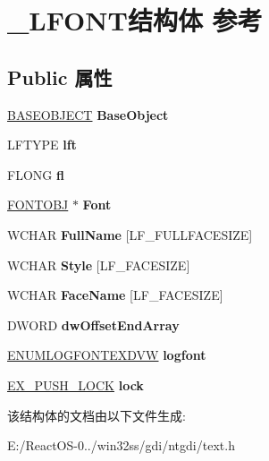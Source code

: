\hypertarget{struct___l_f_o_n_t}{}\section{\+\_\+\+L\+F\+O\+N\+T结构体 参考}
\label{struct___l_f_o_n_t}
\subsection*{Public 属性}
\begin{DoxyCompactItemize}
\item 
\mbox{\label{struct___l_f_o_n_t_a4c292ba24cdbed94a70dd511fed83c4c}} 
\hyperlink{class_b_a_s_e_o_b_j_e_c_t}{B\+A\+S\+E\+O\+B\+J\+E\+CT} {\bfseries Base\+Object}
\item 
\mbox{\label{struct___l_f_o_n_t_a055759a13076f2bf77b63b7d48b99d9d}} 
L\+F\+T\+Y\+PE {\bfseries lft}
\item 
\mbox{\label{struct___l_f_o_n_t_a53afd6843ad26a4816401cbc1c2c8577}} 
F\+L\+O\+NG {\bfseries fl}
\item 
\mbox{\label{struct___l_f_o_n_t_a83db85717136515309c697c16a28aa92}} 
\hyperlink{struct___f_o_n_t_o_b_j}{F\+O\+N\+T\+O\+BJ} $\ast$ {\bfseries Font}
\item 
\mbox{\label{struct___l_f_o_n_t_a316d3fb709a0be38fa950e9d0d05c4e6}} 
W\+C\+H\+AR {\bfseries Full\+Name} \mbox{[}L\+F\+\_\+\+F\+U\+L\+L\+F\+A\+C\+E\+S\+I\+ZE\mbox{]}
\item 
\mbox{\label{struct___l_f_o_n_t_a1ae1439dd278dab1392b977795464342}} 
W\+C\+H\+AR {\bfseries Style} \mbox{[}L\+F\+\_\+\+F\+A\+C\+E\+S\+I\+ZE\mbox{]}
\item 
\mbox{\label{struct___l_f_o_n_t_acc67b04a6b9872917ed00172302952df}} 
W\+C\+H\+AR {\bfseries Face\+Name} \mbox{[}L\+F\+\_\+\+F\+A\+C\+E\+S\+I\+ZE\mbox{]}
\item 
\mbox{\label{struct___l_f_o_n_t_a359cc067c3b280d39e4747ff05f04621}} 
D\+W\+O\+RD {\bfseries dw\+Offset\+End\+Array}
\item 
\mbox{\label{struct___l_f_o_n_t_a72a0c8141b1fadf8cf6e35b2fe6f3a7a}} 
\hyperlink{structtag_e_n_u_m_l_o_g_f_o_n_t_e_x_d_v_w}{E\+N\+U\+M\+L\+O\+G\+F\+O\+N\+T\+E\+X\+D\+VW} {\bfseries logfont}
\item 
\mbox{\label{struct___l_f_o_n_t_aa1140e3cc97c26af0b70dff7700d6d23}} 
\hyperlink{struct___e_x___p_u_s_h___l_o_c_k}{E\+X\+\_\+\+P\+U\+S\+H\+\_\+\+L\+O\+CK} {\bfseries lock}
\end{DoxyCompactItemize}


该结构体的文档由以下文件生成\+:\begin{DoxyCompactItemize}
\item 
E\+:/\+React\+O\+S-\/0../win32ss/gdi/ntgdi/text.\+h\end{DoxyCompactItemize}
